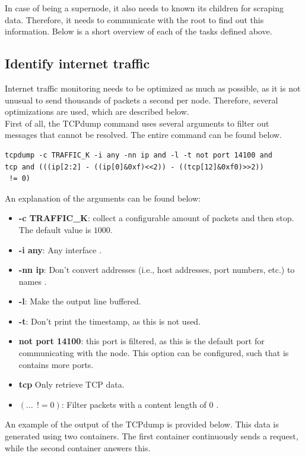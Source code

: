 \noindent
In case of being a supernode, it also needs to known its children for scraping data. Therefore, it needs to communicate with the root to find out this information. Below is a short overview of each of the tasks defined above.

\subsection{Identify internet traffic} \label{sec:identify-traffic}
Internet traffic monitoring needs to be optimized as much as possible, as it is not unusual to send thousands of packets a second per node. Therefore, several optimizations are used, which are described below.\\

\noindent
First of all, the TCPdump command uses several arguments to filter out messages that cannot be resolved. The entire command can be found below.
\begin{verbatim}
tcpdump -c TRAFFIC_K -i any -nn ip and -l -t not port 14100 and
tcp and (((ip[2:2] - ((ip[0]&0xf)<<2)) - ((tcp[12]&0xf0)>>2))
 != 0)
\end{verbatim}
An explanation of the arguments can be found below:
\begin{itemize}
    \item \textbf{-c TRAFFIC\_K}: collect a configurable amount of packets and then stop. The default value is $1000$.
    \item \textbf{-i any}: Any interface \cite{tcpmanpage}.
    \item \textbf{-nn ip}: Don't convert addresses (i.e., host addresses, port numbers, etc.) to names \cite{tcpmanpage}.
    \item \textbf{-l}: Make the output line buffered.
    \item \textbf{-t}: Don't print the timestamp, as this is not used.
    \item \textbf{not port 14100}: this port is filtered, as this is the default port for communicating with the node. This option can be configured, such that is contains more ports.
    \item \textbf{tcp} Only retrieve TCP data.
    \item \textbf{$(\dots~~!= 0)$}: Filter packets with a content length of $0$ \cite{tcpdump-filter}.
\end{itemize}
An example of the output of the TCPdump is provided below. This data is generated using two containers. The first container continuously sends a request, while the second container answers this.
